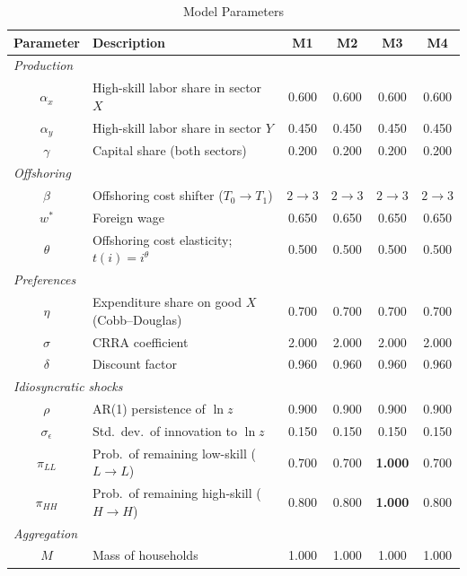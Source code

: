 \documentclass{article}
\begin{document}
\begin{table}[htbp]
\centering
\caption{Model Parameters}
\label{tab:model_parameters}
\renewcommand{\arraystretch}{1.25}
\begin{tabular}{clcccc}
\toprule
Parameter & Description & M1 & M2 & M3 & M4 \\
\midrule
\multicolumn{6}{l}{\textit{Production}} \\[2pt]
$\alpha_x$  & High-skill labor share in sector $X$                        & 0.600 & 0.600 & 0.600 & 0.600 \\
$\alpha_y$  & High-skill labor share in sector $Y$                        & 0.450 & 0.450 & 0.450 & 0.450 \\
$\gamma$    & Capital share (both sectors)                                & 0.200 & 0.200 & 0.200 & 0.200 \\
\midrule
\multicolumn{6}{l}{\textit{Offshoring}} \\[2pt]
$\beta$     & Offshoring cost shifter ($T_0 \to T_1$)                    & $2\!\to\!3$ & $2\!\to\!3$ & $2\!\to\!3$ & $2\!\to\!3$ \\
$w^{*}$     & Foreign wage                                               & 0.650 & 0.650 & 0.650 & 0.650 \\
$\theta$    & Offshoring cost elasticity; $t(i)=i^{\theta}$              & 0.500 & 0.500 & 0.500 & 0.500 \\
\midrule
\multicolumn{6}{l}{\textit{Preferences}} \\[2pt]
$\eta$      & Expenditure share on good $X$ (Cobb--Douglas)              & 0.700 & 0.700 & 0.700 & 0.700 \\
$\sigma$    & CRRA coefficient                                           & 2.000 & 2.000 & 2.000 & 2.000 \\
$\delta$    & Discount factor                                            & 0.960 & 0.960 & 0.960 & 0.960 \\
\midrule
\multicolumn{6}{l}{\textit{Idiosyncratic shocks}} \\[2pt]
$\rho$      & AR(1) persistence of $\ln z$                               & 0.900 & 0.900 & 0.900 & 0.900 \\
$\sigma_\epsilon$ & Std.\ dev.\ of innovation to $\ln z$                 & 0.150 & 0.150 & 0.150 & 0.150 \\
$\pi_{LL}$  & Prob.\ of remaining low-skill ($L \to L$)                  & 0.700 & 0.700 & \textbf{1.000} & 0.700 \\
$\pi_{HH}$  & Prob.\ of remaining high-skill ($H \to H$)                & 0.800 & 0.800 & \textbf{1.000} & 0.800 \\
\midrule
\multicolumn{6}{l}{\textit{Aggregation}} \\[2pt]
$M$         & Mass of households                                         & 1.000 & 1.000 & 1.000 & 1.000 \\
\bottomrule
\end{tabular}


\end{table}
\end{document}
